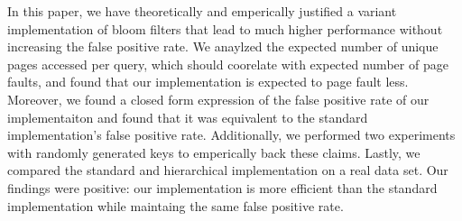 In this paper, we have theoretically and emperically justified a variant implementation of bloom filters
that lead to much higher performance without increasing the false positive rate.
We anaylzed the expected number of unique pages accessed per query, which should coorelate with expected number of page faults, and found that our implementation is expected to page fault less.
Moreover, we found a closed form expression of the false positive rate of our implementaiton and found that it was equivalent to the standard implementation's false positive rate.
Additionally, we performed two experiments with randomly generated keys to emperically back these claims.
Lastly, we compared the standard and hierarchical implementation on a real data set.
Our findings were positive: our implementation is more efficient than the standard implementation while maintaing the same false positive rate.